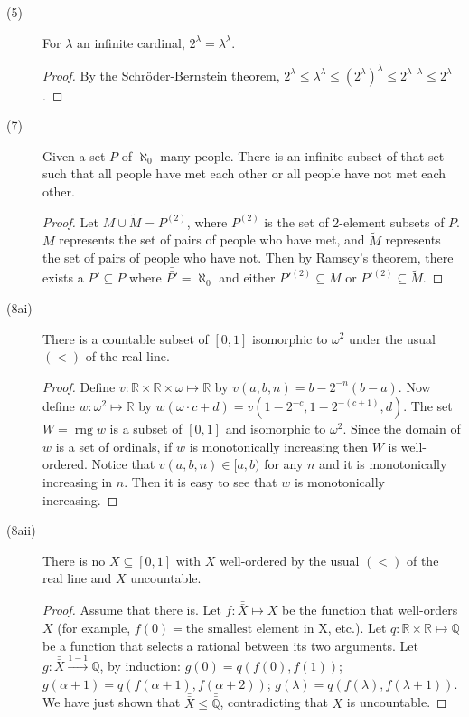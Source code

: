 \documentclass[12pt]{article}
\DeclareMathOperator{\rng}{rng}
\newcommand{\card}[1]{\bar{\bar{#1}}}
\begin{document}
\begin{description}
\item[(5)]
  For $\lambda$ an infinite cardinal, $2^\lambda = \lambda^\lambda$.
  \begin{proof}
    By the Schr\"oder-Bernstein theorem, $2^\lambda \le \lambda^\lambda
	\le (2^\lambda)^\lambda \le 2^{\lambda \cdot \lambda} \le
	2^\lambda$.
  \end{proof}

\item[(7)]
  Given a set $P$ of $\aleph_0$-many people.  There is an infinite
  subset of that set such that all people have met each other or all
  people have not met each other.
  \begin{proof}
	Let $M \cup \tilde{M} = P^{(2)}$, where $P^{(2)}$ is the set of
	2-element subsets of $P$.  $M$ represents the set of pairs of people
	who have met, and $\tilde{M}$ represents the set of pairs of people
	who have not.  Then by Ramsey's theorem, there exists a $P'
	\subseteq P$ where $\card{P'} = \aleph_0$ and either $P'^{(2)}
	\subseteq M$ or $P'^{(2)} \subseteq \tilde{M}$.
  \end{proof}

\item[(8ai)]
  There is a countable subset of $[0,1]$ isomorphic to $\omega^2$ under
  the usual $(<)$ of the real line.
  \begin{proof}
    Define $v: \mathbb{R} \times \mathbb{R} \times \omega \mapsto
	\mathbb{R}$ by $v(a,b,n) = b - 2^{-n}(b-a)$.  Now define $w:
	\omega^2 \mapsto \mathbb{R}$ by $w(\omega \cdot c + d) = v(1 -
	2^{-c}, 1 - 2^{-(c+1)}, d)$.  The set $W = \rng{w}$ is a subset of
	$[0,1]$ and isomorphic to $\omega^2$.  Since the domain of $w$ is a
	set of ordinals, if $w$ is monotonically increasing then $W$ is
	well-ordered.  Notice that $v(a,b,n) \in [a,b)$ for any $n$ and it
	is monotonically increasing in $n$.  Then it is easy to see that $w$
	is monotonically increasing.
  \end{proof}

\item[(8aii)]
  There is no $X \subseteq [0,1]$ with $X$ well-ordered by the usual
  $(<)$ of the real line and $X$ uncountable.
  \begin{proof}
	Assume that there is.  Let $f: \card{X} \mapsto X$ be the function
	that well-orders $X$ (for example, $f(0) = \text{the smallest
	element in X}$, etc.).  Let $q: \mathbb{R} \times \mathbb{R} \mapsto
	\mathbb{Q}$ be a function that selects a rational between its two
	arguments.  Let $g: \card{X} \xrightarrow{1-1}
	\mathbb{Q}$, by induction: $g(0) = q(f(0), f(1))$; $g(\alpha+1) =
	q(f(\alpha+1), f(\alpha+2))$; $g(\lambda) = q(f(\lambda),
	f(\lambda+1))$.  We have just shown that $\card{X} \le
	\card{\mathbb{Q}}$, contradicting that $X$ is uncountable.
  \end{proof}


\end{description}
\end{document}
